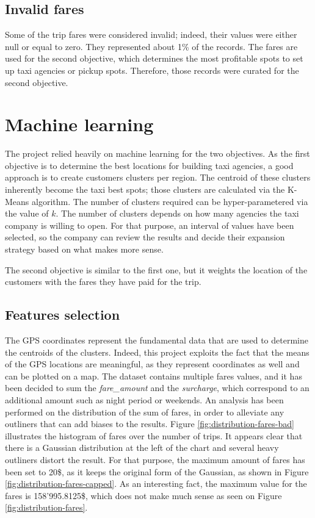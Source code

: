 \documentclass[a4paper]{article}
\begin{document}
\subsection{Invalid fares}
Some of the trip fares were considered invalid; indeed, their values were either null or equal to zero. They represented about 1\% of the records. The fares are used for the second objective, which determines the most profitable spots to set up taxi agencies or pickup spots. Therefore, those records were curated for the second objective.

\section{Machine learning}
The project relied heavily on machine learning for the two objectives. As the first objective is to determine the best locations for building taxi agencies, a good approach is to create customers clusters per region. The centroid of these clusters inherently become the taxi best spots; those clusters are calculated via the K-Means algorithm. The number of clusters required can be hyper-parametered via the value of $k$. The number of clusters depends on how many agencies the taxi company is willing to open. For that purpose, an interval of values have been selected, so the company can review the results and decide their expansion strategy based on what makes more sense.

The second objective is similar to the first one, but it weights the location of the customers with the fares they have paid for the trip.



\subsection{Features selection}
The GPS coordinates represent the fundamental data that are used to determine the centroids of the clusters. Indeed, this project exploits the fact that the means of the GPS locations are meaningful, as they represent coordinates as well and can be plotted on a map. The dataset contains multiple fares values, and it has been decided to sum the \emph{fare\_amount} and the \emph{surcharge}, which correspond to an additional amount such as night period or weekends. An analysis has been performed on the distribution of the sum of fares, in order to alleviate any outliners that can add biases to the results. Figure \ref{fig:distribution-fares-bad} illustrates the histogram of fares over the number of trips. It appears clear that there is a Gaussian distribution at the left of the chart and several heavy outliners distort the result. For that purpose, the maximum amount of fares has been set to 20\$, as it keeps the original form of the Gaussian, as shown in Figure \ref{fig:distribution-fares-capped}. As an interesting fact, the maximum value for the fares is 158'995.8125\$, which does not make much sense as seen on Figure \ref{fig:distribution-fares}.
\end{document}
